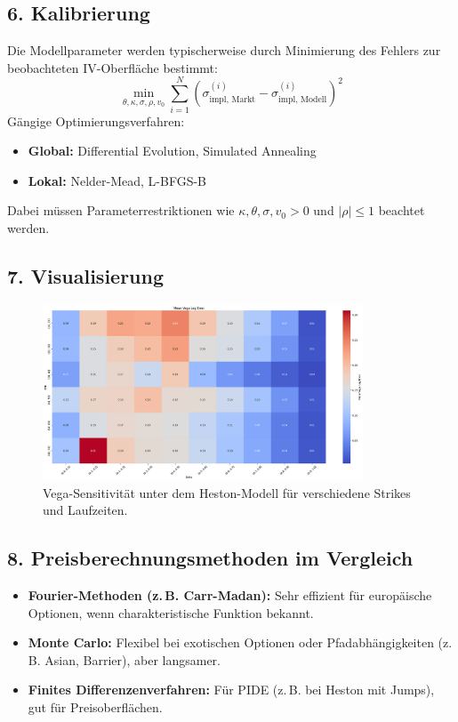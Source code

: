 \documentclass[a4paper,12pt]{article}
\begin{document}
\subsection*{6. Kalibrierung}
Die Modellparameter werden typischerweise durch Minimierung des Fehlers zur beobachteten IV-Oberfläche bestimmt:
\[
  \min_{\theta, \kappa, \sigma, \rho, v_0} \sum_{i=1}^N \left( \sigma_{\text{impl, Markt}}^{(i)} - \sigma_{\text{impl, Modell}}^{(i)} \right)^2
\]
Gängige Optimierungsverfahren:
\begin{itemize}
  \item \textbf{Global:} Differential Evolution, Simulated Annealing
  \item \textbf{Lokal:} Nelder-Mead, L-BFGS-B
\end{itemize}
Dabei müssen Parameterrestriktionen wie $\kappa, \theta, \sigma, v_0 > 0$ und $|\rho| \leq 1$ beachtet werden.

\subsection*{7. Visualisierung}
\begin{figure}[h]
  \centering
  \includegraphics[width=0.85\textwidth]{heston_vega_heatmap.png}
  \caption{Vega-Sensitivität unter dem Heston-Modell für verschiedene Strikes und Laufzeiten.}
\end{figure}


\subsection*{8. Preisberechnungsmethoden im Vergleich}
\begin{tcolorbox}[title=Wann welche Methode?]
\begin{itemize}
  \item \textbf{Fourier-Methoden (z.\,B. Carr-Madan):} Sehr effizient für europäische Optionen, wenn charakteristische Funktion bekannt.
  \item \textbf{Monte Carlo:} Flexibel bei exotischen Optionen oder Pfadabhängigkeiten (z.\,B. Asian, Barrier), aber langsamer.
  \item \textbf{Finites Differenzenverfahren:} Für PIDE (z.\,B. bei Heston mit Jumps), gut für Preisoberflächen.
\end{itemize}
\end{tcolorbox}
\end{document}
